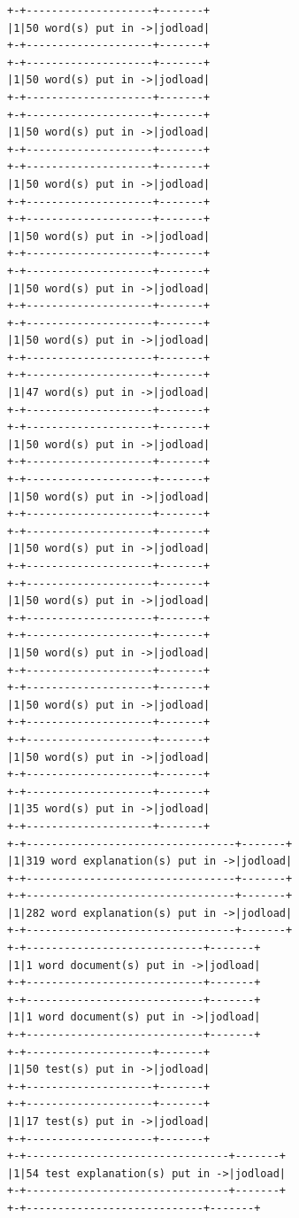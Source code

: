 \documentclass[11pt,letter,landscape]{article}
\begin{document}
    \begin{Verbatim}[commandchars=\\\{\}]
+-+--------------------+-------+
|1|50 word(s) put in ->|jodload|
+-+--------------------+-------+
+-+--------------------+-------+
|1|50 word(s) put in ->|jodload|
+-+--------------------+-------+
+-+--------------------+-------+
|1|50 word(s) put in ->|jodload|
+-+--------------------+-------+
+-+--------------------+-------+
|1|50 word(s) put in ->|jodload|
+-+--------------------+-------+
+-+--------------------+-------+
|1|50 word(s) put in ->|jodload|
+-+--------------------+-------+
+-+--------------------+-------+
|1|50 word(s) put in ->|jodload|
+-+--------------------+-------+
+-+--------------------+-------+
|1|50 word(s) put in ->|jodload|
+-+--------------------+-------+
+-+--------------------+-------+
|1|47 word(s) put in ->|jodload|
+-+--------------------+-------+
+-+--------------------+-------+
|1|50 word(s) put in ->|jodload|
+-+--------------------+-------+
+-+--------------------+-------+
|1|50 word(s) put in ->|jodload|
+-+--------------------+-------+
+-+--------------------+-------+
|1|50 word(s) put in ->|jodload|
+-+--------------------+-------+
+-+--------------------+-------+
|1|50 word(s) put in ->|jodload|
+-+--------------------+-------+
+-+--------------------+-------+
|1|50 word(s) put in ->|jodload|
+-+--------------------+-------+
+-+--------------------+-------+
|1|50 word(s) put in ->|jodload|
+-+--------------------+-------+
+-+--------------------+-------+
|1|50 word(s) put in ->|jodload|
+-+--------------------+-------+
+-+--------------------+-------+
|1|35 word(s) put in ->|jodload|
+-+--------------------+-------+
+-+---------------------------------+-------+
|1|319 word explanation(s) put in ->|jodload|
+-+---------------------------------+-------+
+-+---------------------------------+-------+
|1|282 word explanation(s) put in ->|jodload|
+-+---------------------------------+-------+
+-+----------------------------+-------+
|1|1 word document(s) put in ->|jodload|
+-+----------------------------+-------+
+-+----------------------------+-------+
|1|1 word document(s) put in ->|jodload|
+-+----------------------------+-------+
+-+--------------------+-------+
|1|50 test(s) put in ->|jodload|
+-+--------------------+-------+
+-+--------------------+-------+
|1|17 test(s) put in ->|jodload|
+-+--------------------+-------+
+-+--------------------------------+-------+
|1|54 test explanation(s) put in ->|jodload|
+-+--------------------------------+-------+
+-+----------------------------+-------+

\end{Verbatim}
\end{document}
